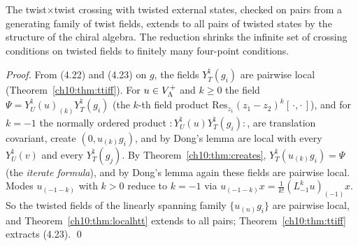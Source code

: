 \begin{physics}
The twist$\times$twist crossing with twisted external states, checked on pairs from a generating family of twist fields, extends to all pairs of twisted states by the structure of the chiral algebra. The reduction shrinks the infinite set of crossing conditions on twisted fields to finitely many four-point conditions.
\end{physics}

\emph{Proof.}  From (4.22) and (4.23) on $g$, the fields $Y^\natural_T(g_i)$ are pairwise local
(Theorem~\ref{ch10:thm:ttiff}).  For $u\in V_{\Lambda}^{+}$ and $k\ge0$ the field
$\Psi=Y^\natural_U(u)_{(k)}Y^\natural_T(g_i)$ (the $k$-th field product
$\mathrm{Res}_{z_1}(z_1-z_2)^k[\,\cdot,\cdot\,]$), and for $k=-1$ the normally ordered product
${:}Y^\natural_U(u)Y^\natural_T(g_i){:}$, are translation covariant, create $(0,u_{(k)}g_i)$, and by
Dong's lemma are local with every $Y^\natural_U(v)$ and every $Y^\natural_T(g_j)$.  By
Theorem~\ref{ch10:thm:creates}, $Y^\natural_T(u_{(k)}g_i)=\Psi$ (the \emph{iterate formula}), and by
Dong's lemma again these fields are pairwise local.  Modes $u_{(-1-k)}$ with $k>0$ reduce to
$k=-1$ via $u_{(-1-k)}x=\frac1{k!}(L_{-1}^ku)_{(-1)}x$.  So the twisted fields of the linearly
spanning family $\{u_{(n)}g_i\}$ are pairwise local, and Theorem~\ref{ch10:thm:localhtt} extends to
all pairs; Theorem~\ref{ch10:thm:ttiff} extracts (4.23). \qed

